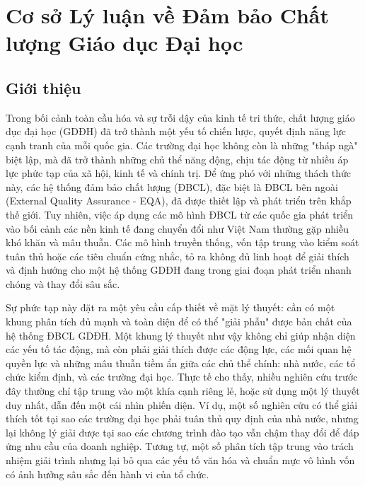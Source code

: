 \documentclass[12pt, a4paper, openany]{report}
\begin{document}
\chapter{Cơ sở Lý luận về Đảm bảo Chất lượng Giáo dục Đại học}
\label{chap:ly_luan}

\section*{Giới thiệu}

Trong bối cảnh toàn cầu hóa và sự trỗi dậy của kinh tế tri thức, chất lượng giáo dục đại học (GDĐH) đã trở thành một yếu tố chiến lược, quyết định năng lực cạnh tranh của mỗi quốc gia. Các trường đại học không còn là những "tháp ngà" biệt lập, mà đã trở thành những chủ thể năng động, chịu tác động từ nhiều áp lực phức tạp của xã hội, kinh tế và chính trị. Để ứng phó với những thách thức này, các hệ thống đảm bảo chất lượng (ĐBCL), đặc biệt là ĐBCL bên ngoài (External Quality Assurance - EQA), đã được thiết lập và phát triển trên khắp thế giới. Tuy nhiên, việc áp dụng các mô hình ĐBCL từ các quốc gia phát triển vào bối cảnh các nền kinh tế đang chuyển đổi như Việt Nam thường gặp nhiều khó khăn và mâu thuẫn. Các mô hình truyền thống, vốn tập trung vào kiểm soát tuân thủ hoặc các tiêu chuẩn cứng nhắc, tỏ ra không đủ linh hoạt để giải thích và định hướng cho một hệ thống GDĐH đang trong giai đoạn phát triển nhanh chóng và thay đổi sâu sắc.

Sự phức tạp này đặt ra một yêu cầu cấp thiết về mặt lý thuyết: cần có một khung phân tích đủ mạnh và toàn diện để có thể "giải phẫu" được bản chất của hệ thống ĐBCL GDĐH. Một khung lý thuyết như vậy không chỉ giúp nhận diện các yếu tố tác động, mà còn phải giải thích được các động lực, các mối quan hệ quyền lực và những mâu thuẫn tiềm ẩn giữa các chủ thể chính: nhà nước, các tổ chức kiểm định, và các trường đại học. Thực tế cho thấy, nhiều nghiên cứu trước đây thường chỉ tập trung vào một khía cạnh riêng lẻ, hoặc sử dụng một lý thuyết duy nhất, dẫn đến một cái nhìn phiến diện. Ví dụ, một số nghiên cứu có thể giải thích tốt tại sao các trường đại học phải tuân thủ quy định của nhà nước, nhưng lại không lý giải được tại sao các chương trình đào tạo vẫn chậm thay đổi để đáp ứng nhu cầu của doanh nghiệp. Tương tự, một số phân tích tập trung vào trách nhiệm giải trình nhưng lại bỏ qua các yếu tố văn hóa và chuẩn mực vô hình vốn có ảnh hưởng sâu sắc đến hành vi của tổ chức.
\end{document}
